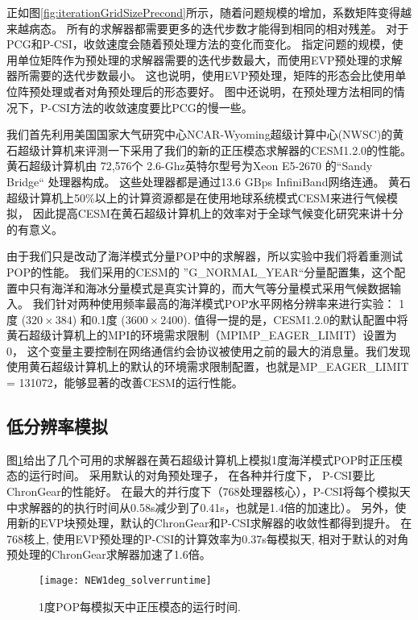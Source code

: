 正如图\ref{fig:iterationGridSizePrecond}所示，随着问题规模的增加，系数矩阵变得越来越病态。
所有的求解器都需要更多的迭代步数才能得到相同的相对残差。
对于PCG和P-CSI，收敛速度会随着预处理方法的变化而变化。 
指定问题的规模，使用单位矩阵作为预处理的求解器需要的迭代步数最大，而使用EVP预处理的求解器所需要的迭代步数最小。 
这也说明，使用EVP预处理，矩阵的形态会比使用单位阵预处理或者对角预处理后的形态要好。 
图中还说明，在预处理方法相同的情况下，P-CSI方法的收敛速度要比PCG的慢一些。 




我们首先利用美国国家大气研究中心NCAR-Wyoming超级计算中心(NWSC)\cite{loft:2015}的黄石超级计算机来评测一下采用了我们的新的正压模态求解器的CESM1.2.0的性能。 
黄石超级计算机由 72,576个
2.6-Ghz英特尔型号为Xeon E5-2670 的“Sandy Bridge“ 处理器构成。 
这些处理器都是通过13.6 GBps InfiniBand网络连通。   
黄石超级计算机上50\%以上的计算资源都是在使用地球系统模式CESM来进行气候模拟， 
因此提高CESM在黄石超级计算机上的效率对于全球气候变化研究来讲十分的有意义\cite{wf2014}。 


由于我们只是改动了海洋模式分量POP中的求解器，所以实验中我们将着重测试POP的性能。 
我们采用的CESM的
”G\_NORMAL\_YEAR“分量配置集，这个配置中只有海洋和海冰分量模式是真实计算的，而大气等分量模式采用气候数据输入。
我们针对两种使用频率最高的海洋模式POP水平网格分辨率来进行实验：
1度 ($320\times 384$) 和0.1度 ($3600\times 2400$).
值得一提的是，CESM1.2.0的默认配置中将黄石超级计算机上的MPI的环境需求限制（MPIMP\_EAGER\_LIMIT）设置为0， 这个变量主要控制在网络通信约会协议被使用之前的最大的消息量。我们发现使用黄石超级计算机上的默认的环境需求限制配置，也就是MP\_EAGER\_LIMIT = 131072，能够显著的改善CESM的运行性能。 



\subsection{低分辨率模拟}
\label{precond:exp:low}
图\ref{fig:runtime1}给出了几个可用的求解器在黄石超级计算机上模拟1度海洋模式POP时正压模态的运行时间。  
采用默认的对角预处理子， 在各种并行度下， P-CSI要比ChronGear的性能好。
在最大的并行度下（768处理器核心），P-CSI将每个模拟天中求解器的的执行时间从0.58s减少到了0.41s，也就是1.4倍的加速比）。 
另外，使用新的EVP块预处理，默认的ChronGear和P-CSI求解器的收敛性都得到提升。 
在768核上, 使用EVP预处理的P-CSI的计算效率为0.37s每模拟天, 相对于默认的对角预处理的ChronGear求解器加速了1.6倍。 

\begin {figure}
\centering
\texttt{[image: NEW1deg\_solverruntime]}
\caption []{1度POP每模拟天中正压模态的运行时间.\label {fig:runtime1}}
\end {figure}

